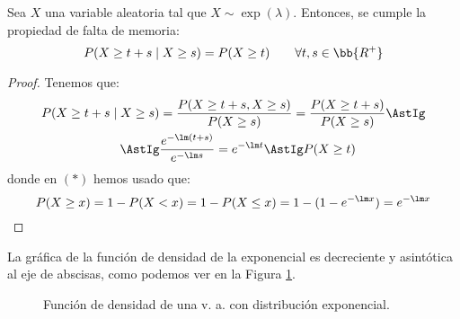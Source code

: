 \begin{prop}
    Sea $X$ una variable aleatoria tal que $X\sim \exp(\lambda)$. Entonces, se cumple la propiedad de falta de memoria:
    \begin{equation*}
        P(X\geq t + s \mid X\geq s) = P(X\geq t) \qquad \forall t,s \in \bb{R^+}
    \end{equation*}
    \begin{proof}
        Tenemos que:
        \begin{align*}
            P(X\geq t + s \mid X\geq s) &= \frac{P(X\geq t+s, X\geq s)}{P(X\geq s)} = \frac{P(X\geq t+s)}{P(X\geq s)} \AstIg\\
            \AstIg & \dfrac{e^{-\lm(t+s)}}{e^{-\lm s}} = e^{-\lm t} \AstIg P(X\geq t)
        \end{align*}
        donde en $(\ast)$ hemos usado que:
        \begin{equation*}
            P(X\geq x) = 1-P(X<x) = 1-P(X\leq x) = 1-(1-e^{-\lm x}) = e^{-\lm x}
        \end{equation*}
    \end{proof}
\end{prop}

La gráfica de la función de densidad de la exponencial es decreciente y asintótica al eje de abscisas, como podemos ver en la Figura \ref{fig:exp}.
\begin{figure}[H]
    \centering
    \caption{Función de densidad de una v. a. con distribución exponencial.}
    \label{fig:exp}
\end{figure}

